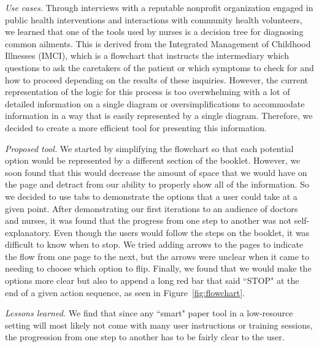 \documentclass{sig-alternate}
\begin{document}
\emph{Use cases.}
Through interviews with a reputable nonprofit organization engaged in public health interventions and interactions with community health volunteers, we learned that one of the tools used by nurses is a decision tree for diagnosing common ailments. This is derived from the Integrated Management of Childhood Illnesses (IMCI), which is a flowchart that instructs the intermediary which questions to ask the caretakers of the patient or which symptoms to check for and how to proceed depending on the results of these inquiries. However, the current representation of the logic for this process is too overwhelming with a lot of detailed information on a single diagram or oversimplifications to accommodate information in a way that is easily represented by a single diagram. Therefore, we decided to create a more efficient tool for presenting this information.

\emph{Proposed tool.}
We started by simplifying the flowchart so that each potential option would be represented by a different section of the booklet. However, we soon found that this would decrease the amount of space that we would have on the page and detract from our ability to properly show all of the information. So we decided to use tabs to demonstrate the options that a user could take at a given point. After demonstrating our first iterations to an audience of doctors and nurses, it was found that the progress from one step to another was not self-explanatory. Even though the users would follow the steps on the booklet, it was difficult to know when to stop. We tried adding arrows to the pages to indicate the flow from one page to the next, but the arrows were unclear when it came to needing to choose which option to flip. Finally, we found that we would make the options more clear but also to append a long red bar that said ``STOP" at the end of a given action sequence, as seen in Figure~\ref{fig:flowchart}.

\emph{Lessons learned.}
We find that since any ``smart" paper tool in a low-resource setting will most likely not come with many user instructions or training sessions, the progression from one step to another has to be fairly clear to the user.
\end{document}
